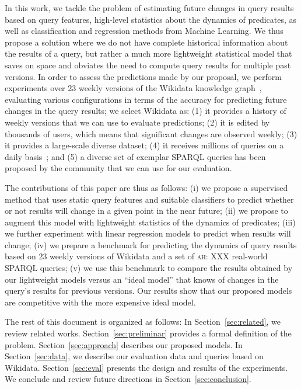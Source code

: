 \documentclass[runningheads]{llncs}
\newcommand{\ah}[1]{{\color{blue}\textsc{ah:} #1}}
\begin{document}
In this work, we tackle the problem of estimating future changes in query results based on query features, high-level statistics about the dynamics of predicates, as well as classification and regression methods from Machine Learning. We thus propose a solution where we do not have complete historical information about the results of a query, but rather a much more lightweight statistical model that saves on space and obviates the need to compute query results for multiple past versions. In order to assess the predictions made by our proposal, we perform experiments over 23 weekly versions of the Wikidata knowledge graph~\cite{VrandecicK14}, evaluating various configurations in terms of the accuracy for predicting future changes in the query results; we select Wikidata as: (1) it provides a history of weekly versions that we can use to evaluate predictions; (2) it is edited by thousands of users, which means that significant changes are observed weekly; (3) it provides a large-scale diverse dataset; (4) it receives millions of queries on a daily basis~\cite{MalyshevKGGB18}; and (5) a diverse set of exemplar SPARQL queries has been proposed by the community that we can use for our evaluation.

The contributions of this paper are thus as follows: (i) we propose a supervised method that uses static query features and suitable classifiers to predict whether or not results will change in a given point in the near future; (ii) we propose to augment this model with lightweight statistics of the dynamics of predicates; (iii) we further experiment with linear regression models to predict when results will change; (iv) we prepare a benchmark for predicting the dynamics of query results based on 23 weekly versions of Wikidata and a set of \ah{XXX} real-world SPARQL queries; (v) we use this benchmark to compare the results obtained by our lightweight models versus an ``ideal model'' that knows of changes in the query's results for previous versions. Our results show that our proposed models are competitive with the more expensive ideal model.

The rest of this document is organized as follows: In Section~\ref{sec:related}, we review related works. Section~\ref{sec:preliminar} provides a formal definition of the problem. Section~\ref{sec:approach} describes our proposed models. In Section~\ref{sec:data}, we describe our evaluation data and queries based on Wikidata. Section~\ref{sec:eval} presents the design and results of the experiments. We conclude and review future directions in Section~\ref{sec:conclusion}.
\end{document}
